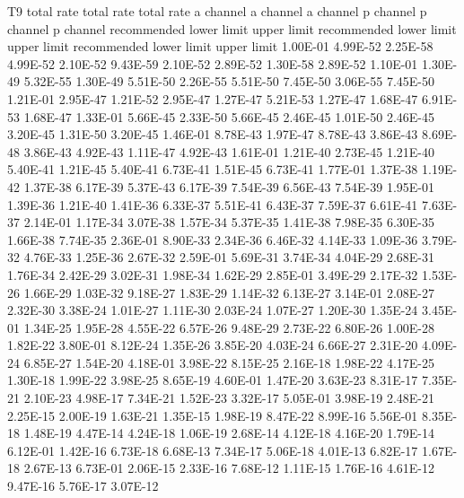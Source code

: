   T9       total rate  total rate  total rate  a channel   a channel   a channel   p channel   p channel   p channel
          recommended lower limit upper limit recommended lower limit upper limit recommended lower limit upper limit
1.00E-01    4.99E-52    2.25E-58    4.99E-52    2.10E-52    9.43E-59    2.10E-52    2.89E-52    1.30E-58    2.89E-52
1.10E-01    1.30E-49    5.32E-55    1.30E-49    5.51E-50    2.26E-55    5.51E-50    7.45E-50    3.06E-55    7.45E-50
1.21E-01    2.95E-47    1.21E-52    2.95E-47    1.27E-47    5.21E-53    1.27E-47    1.68E-47    6.91E-53    1.68E-47
1.33E-01    5.66E-45    2.33E-50    5.66E-45    2.46E-45    1.01E-50    2.46E-45    3.20E-45    1.31E-50    3.20E-45
1.46E-01    8.78E-43    1.97E-47    8.78E-43    3.86E-43    8.69E-48    3.86E-43    4.92E-43    1.11E-47    4.92E-43
1.61E-01    1.21E-40    2.73E-45    1.21E-40    5.40E-41    1.21E-45    5.40E-41    6.73E-41    1.51E-45    6.73E-41
1.77E-01    1.37E-38    1.19E-42    1.37E-38    6.17E-39    5.37E-43    6.17E-39    7.54E-39    6.56E-43    7.54E-39
1.95E-01    1.39E-36    1.21E-40    1.41E-36    6.33E-37    5.51E-41    6.43E-37    7.59E-37    6.61E-41    7.63E-37
2.14E-01    1.17E-34    3.07E-38    1.57E-34    5.37E-35    1.41E-38    7.98E-35    6.30E-35    1.66E-38    7.74E-35
2.36E-01    8.90E-33    2.34E-36    6.46E-32    4.14E-33    1.09E-36    3.79E-32    4.76E-33    1.25E-36    2.67E-32
2.59E-01    5.69E-31    3.74E-34    4.04E-29    2.68E-31    1.76E-34    2.42E-29    3.02E-31    1.98E-34    1.62E-29
2.85E-01    3.49E-29    2.17E-32    1.53E-26    1.66E-29    1.03E-32    9.18E-27    1.83E-29    1.14E-32    6.13E-27
3.14E-01    2.08E-27    2.32E-30    3.38E-24    1.01E-27    1.11E-30    2.03E-24    1.07E-27    1.20E-30    1.35E-24
3.45E-01    1.34E-25    1.95E-28    4.55E-22    6.57E-26    9.48E-29    2.73E-22    6.80E-26    1.00E-28    1.82E-22
3.80E-01    8.12E-24    1.35E-26    3.85E-20    4.03E-24    6.66E-27    2.31E-20    4.09E-24    6.85E-27    1.54E-20
4.18E-01    3.98E-22    8.15E-25    2.16E-18    1.98E-22    4.17E-25    1.30E-18    1.99E-22    3.98E-25    8.65E-19
4.60E-01    1.47E-20    3.63E-23    8.31E-17    7.35E-21    2.10E-23    4.98E-17    7.34E-21    1.52E-23    3.32E-17
5.05E-01    3.98E-19    2.48E-21    2.25E-15    2.00E-19    1.63E-21    1.35E-15    1.98E-19    8.47E-22    8.99E-16
5.56E-01    8.35E-18    1.48E-19    4.47E-14    4.24E-18    1.06E-19    2.68E-14    4.12E-18    4.16E-20    1.79E-14
6.12E-01    1.42E-16    6.73E-18    6.68E-13    7.34E-17    5.06E-18    4.01E-13    6.82E-17    1.67E-18    2.67E-13
6.73E-01    2.06E-15    2.33E-16    7.68E-12    1.11E-15    1.76E-16    4.61E-12    9.47E-16    5.76E-17    3.07E-12
